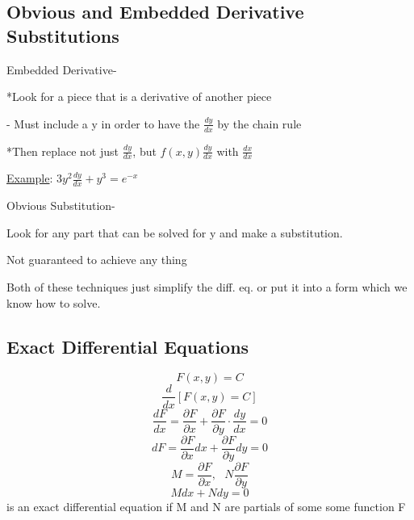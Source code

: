 \documentclass[12pt]{article}
\numberwithin{equation}{subsection}
\newcommand{\parx}[1]{\frac{\partial #1}{\partial x}}
\newcommand{\pary}[1]{\frac{\partial #1}{\partial y}}
\newcommand{\derx}[1]{\frac{d #1}{dx}}
\newcommand{\deryx}{\frac{dy}{dx}}
\newcommand{\inda}{\hspace{.5cm}}
\newcommand{\indb}{\hspace{1cm}}
\newcommand{\indd}{\hspace{2cm}}
\begin{document}
\subsection{Obvious and Embedded Derivative Substitutions}
Embedded Derivative-

\inda *Look for a piece that is a derivative of another piece

\indb - Must include a y in order to have the $\deryx$ by the chain rule

\inda *Then replace not just $\deryx$, but $f(x,y) \deryx$ with $\derx{x}$

\indd \underline{Example}: \hspace{1cm} $3y^2\deryx + y^3 = e^{-x}$


\bigskip

\noindent Obvious Substitution-

\inda Look for any part that can be solved for y and make a substitution.

\indb Not guaranteed to achieve any thing


\bigskip

\noindent Both of these techniques just simplify the diff. eq. or put it into a form which we know how to solve.

\newpage
\subsection{Exact Differential Equations}
\begin{equation}
F(x,y)=C
\end{equation}
\begin{equation}
\derx{} [F(x,y)=C]
\end{equation}
\begin{equation}
\derx{F}=\parx{F} + \pary{F} \cdot \deryx = 0
\end{equation}
\begin{equation}
dF= \parx{F}dx + \pary{F}dy=0
\end{equation}
\begin{equation}
M=\parx{F},\ \ \ N\pary{F}
\end{equation}
\begin{equation}
Mdx+Ndy=0
\end{equation}
is an exact differential equation if M and N are partials of some some function F\\
\end{document}
